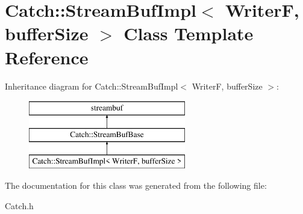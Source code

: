 \hypertarget{class_catch_1_1_stream_buf_impl}{\section{Catch\-:\-:Stream\-Buf\-Impl$<$ Writer\-F, buffer\-Size $>$ Class Template Reference}
\label{class_catch_1_1_stream_buf_impl}
}
Inheritance diagram for Catch\-:\-:Stream\-Buf\-Impl$<$ Writer\-F, buffer\-Size $>$\-:\begin{figure}[H]
\begin{center}
\leavevmode
\includegraphics[height=3.000000cm]{class_catch_1_1_stream_buf_impl}
\end{center}
\end{figure}


The documentation for this class was generated from the following file\-:\begin{DoxyCompactItemize}
\item 
Catch.\-h\end{DoxyCompactItemize}
